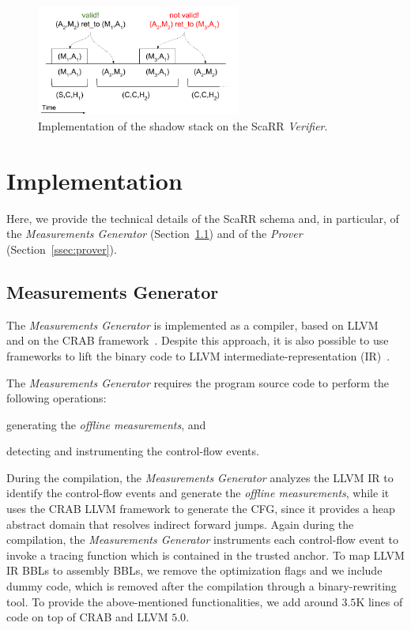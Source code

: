 \begin{figure}[t]
	\centering
	\includegraphics[width=0.6\textwidth]{fig_c4/shadow-stack-no.pdf}
	\caption{Implementation of the shadow stack on the ScaRR \emph{Verifier}.}
	\label{fig:shadow-stack}
\end{figure}

\section{Implementation}
\label{sec:implementation_scarr}

Here, we provide the technical details of the ScaRR schema and, in particular, 
of the \emph{Measurements Generator} 
(Section~\ref{ssec:measurements_generator}) and of the \emph{Prover} 
(Section~\ref{ssec:prover}). 

\subsection{Measurements Generator}
\label{ssec:measurements_generator}
The \emph{Measurements Generator} is implemented as a compiler, based on 
LLVM~\cite{lattner2004llvm} and on the CRAB framework~\cite{gange2016abstract}. 
Despite this approach, it is also possible to use frameworks to lift the binary 
code to LLVM intermediate-representation (IR)~\cite{mcsema}.

The \emph{Measurements Generator} requires the program source code to perform 
the following operations:
\begin{enumerate*}[label=(\roman*)]
	\item generating the \emph{offline measurements}, and 
	\item detecting and instrumenting the control-flow events.
\end{enumerate*}
During the compilation, the \emph{Measurements Generator} analyzes the LLVM IR 
to identify the control-flow events and generate the \emph{offline 
measurements}, while it uses the CRAB LLVM framework to generate the CFG, since 
it provides a heap abstract domain that resolves indirect forward jumps.
Again during the compilation, the \emph{Measurements Generator} instruments 
each control-flow event to invoke a tracing function 
which is contained in the trusted anchor.
To map LLVM IR BBLs to assembly BBLs, we remove the optimization flags and we 
include dummy code,
which is removed after the compilation through a binary-rewriting tool.
To provide the above-mentioned functionalities, we add around $3.5$K lines of 
code on top of CRAB and LLVM $5.0$.

